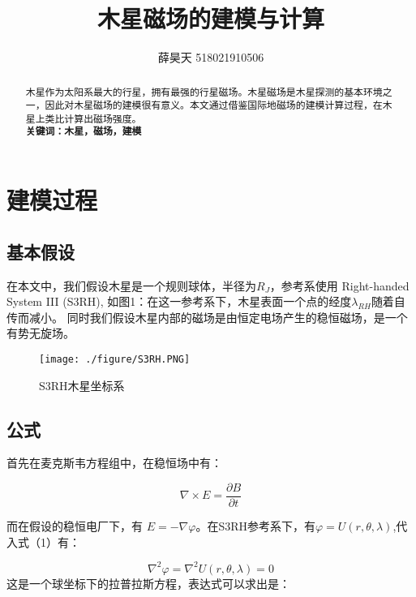 \documentclass{article}
\begin{document}
\title{木星磁场的建模与计算}
\author{薛昊天 518021910506}
\date{}

\maketitle
\begin{abstract}
   木星作为太阳系最大的行星，拥有最强的行星磁场。木星磁场是木星探测的基本环境之一，因此对木星磁场的建模很有意义。本文通过借鉴国际地磁场的建模计算过程，在木星上类比计算出磁场强度。\\
  \textbf{关键词：木星，磁场，建模}
  
\end{abstract}




\section{建模过程}
 \subsection{基本假设}
   在本文中，我们假设木星是一个规则球体，半径为$R_J$，参考系使用 Right-handed System III
   (S3RH), 如图1：在这一参考系下，木星表面一个点的经度$\lambda_{RH}$随着自传而减小。
   同时我们假设木星内部的磁场是由恒定电场产生的稳恒磁场，是一个有势无旋场。
   
\begin{figure}
    \centering
    \texttt{[image: ./figure/S3RH.PNG]}
    \caption{S3RH木星坐标系}
    \label{fig:my_label}
\end{figure}   

   \subsection{公式}
   首先在麦克斯韦方程组中，在稳恒场中有：
   
   \begin{equation} 
       \nabla \times E = \frac{\partial{B}}{\partial{t}} 
   \end{equation}

   而在假设的稳恒电厂下，有 $E=-\nabla{\varphi}$。在S3RH参考系下，有$\varphi=U(r,\theta,\lambda)$,代入式（1）有：
   
   \begin{equation} 
       \nabla^{2}\varphi=\nabla^{2}U(r,\theta,\lambda)=0
   \end{equation}
   这是一个球坐标下的拉普拉斯方程，表达式可以求出是：
\end{document}
